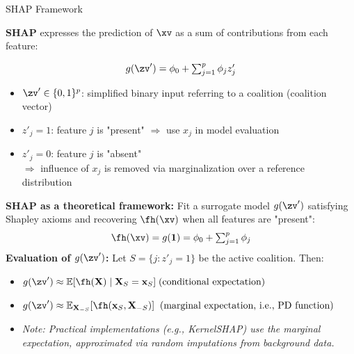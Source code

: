 \documentclass[11pt,compress,t,notes=noshow, aspectratio=169, xcolor=table]{beamer}
\begin{document}
\begin{frame}{SHAP Framework }

\textbf{SHAP} expresses the prediction of $\xv$ as a sum of contributions from each feature:

\[
g(\zv') = \phi_0 + \textstyle\sum_{j=1}^p \phi_j z'_j
\]

\begin{itemize}
  \item $\zv' \in \{0,1\}^p$: simplified binary input referring to a coalition (coalition vector)
  \item \(z'_j = 1\): feature $j$ is "present" $\Rightarrow$ use $x_j$ in model evaluation
  \item \(z'_j = 0\): feature $j$ is "absent"\\$\Rightarrow$ influence of $x_j$ is removed via marginalization over a reference distribution%
\end{itemize}

\pause\medskip

\textbf{SHAP as a theoretical framework:} Fit a surrogate model \( g(\zv') \) satisfying Shapley axioms and recovering $\fh(\xv)$ when all features are "present":
\[
\fh(\xv) = g(\mathbf{1}) = \phi_0 + \textstyle\sum_{j=1}^p \phi_j
\]
\textbf{Evaluation of $g(\zv')$:} Let \( S = \{ j : z'_j = 1 \} \) be the active coalition. Then:
\begin{itemize}
    \item $g(\zv') \approx \mathbb{E}[ \fh(\mathbf{X}) \mid \mathbf{X}_S = \mathbf{x}_S]\;\text{(conditional expectation)}$
    \item $g(\zv') \approx \mathbb{E}_{\mathbf{X}_{-S}} [ \fh(\mathbf{x}_S, \mathbf{X}_{-S}) ] \;\;\text{(marginal expectation, i.e., PD function)}$
    \item\textit{Note: Practical implementations (e.g., KernelSHAP) use the marginal expectation, approximated via random imputations from background data.}
\end{itemize}

\end{frame}
\end{document}
